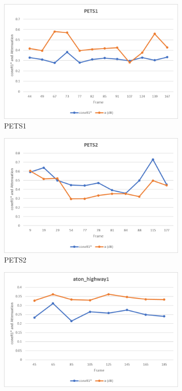 \begin{appendices}
\begin{figure}
  \begin{subfigure}{.45\linewidth}
  \includegraphics[width=1\linewidth]{figures/appendix/pets1_db.jpg}
  \caption{PETS1}
\end{subfigure}
\hfill
\begin{subfigure}{.45\linewidth}
  \includegraphics[width=1\linewidth]{figures/appendix/pets2_db.jpg}
  \caption{PETS2}
\end{subfigure}
\hfill
\begin{subfigure}{.45\linewidth}
  \includegraphics[width=1\linewidth]{figures/appendix/highway1_db.jpg}

\end{subfigure}
\end{figure}
\end{appendices}

